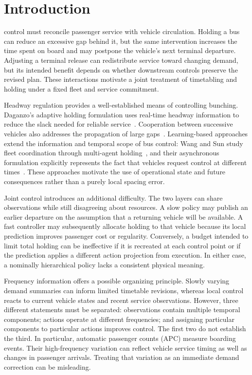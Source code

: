 \section{Introduction}
 control must reconcile passenger service with vehicle circulation. Holding a bus can reduce an excessive gap behind it, but the same intervention increases the time spent on board and may postpone the vehicle's next terminal departure. Adjusting a terminal release can redistribute service toward changing demand, but its intended benefit depends on whether downstream controls preserve the revised plan. These interactions motivate a joint treatment of timetabling and holding under a fixed fleet and service commitment.

Headway regulation provides a well-established means of controlling bunching. Daganzo's adaptive holding formulation uses real-time headway information to reduce the slack needed for reliable service~\cite{daganzo2009headway}. Cooperation between successive vehicles also addresses the propagation of large gaps~\cite{daganzo2011cooperation}. Learning-based approaches extend the information and temporal scope of bus control: Wang and Sun study fleet coordination through multi-agent holding~\cite{wang2020dynamic}, and their asynchronous formulation explicitly represents the fact that vehicles request control at different times~\cite{wang2021asynchronous}. These approaches motivate the use of operational state and future consequences rather than a purely local spacing error.

Joint control introduces an additional difficulty. The two layers can share observations while still disagreeing about resources. A slow policy may publish an earlier departure on the assumption that a returning vehicle will be available. A fast controller may subsequently allocate holding to that vehicle because its local prediction improves passenger cost or regularity. Conversely, a budget intended to limit total holding can be ineffective if it is recreated at each control point or if the prediction applies a different action projection from execution. In either case, a nominally hierarchical policy lacks a consistent physical meaning.

Frequency information offers a possible organizing principle. Slowly varying demand summaries can inform limited timetable revisions, whereas local control reacts to current vehicle states and recent service observations. However, three different statements must be separated: observations contain multiple temporal components; actions operate at different frequencies; and assigning particular components to particular actions improves control. The first two do not establish the third. In particular, automatic passenger counts (APC) measure boarding events. Their high-frequency variation can reflect vehicle service timing as well as changes in passenger arrivals. Treating that variation as an immediate demand correction can be misleading.

